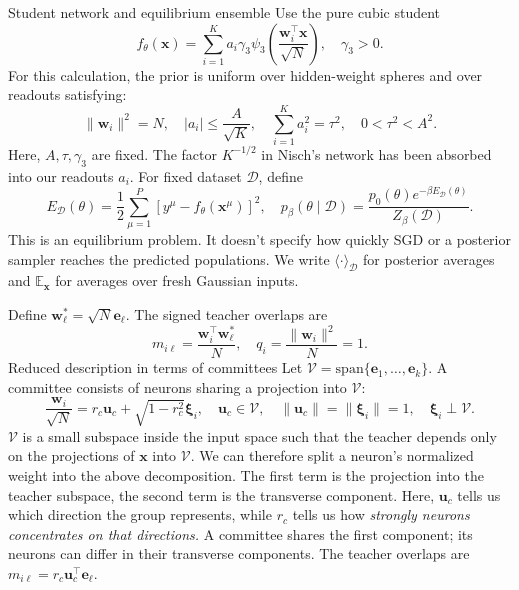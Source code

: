 \documentclass[11pt, reqno]{amsart}
\makeatletter
\def\section{\@startsection{section}{1}%
  \z@{.7\linespacing\@plus\linespacing}{.5\linespacing}%
  {\normalfont\scshape\centering}}
\theoremstyle{notestyle}
\theoremstyle{defstyle}
\makeatother
\begin{document}
\section{Student network and equilibrium ensemble}
Use the pure cubic student
\begin{equation}
    f_\theta(\mathbf x) = \sum_{i=1}^K a_i \gamma_3 \psi_3\left( \frac{\mathbf w_i^\top \mathbf x}{\sqrt N}\right),\quad \gamma_3 > 0.
\end{equation}
For this calculation, the prior is uniform over hidden-weight spheres and over readouts satisfying:
\begin{equation}
    \|\mathbf w_i\|^2 = N,\quad |a_i| \leq \frac{A}{\sqrt K},\quad \sum_{i=1}^K a_i^2 = \tau^2,\quad 0 < \tau^2 < A^2.
\end{equation}
Here, $A, \tau, \gamma_3$ are fixed. The factor $K^{-1/2}$ in Nisch's network has been absorbed into our readouts $a_i$. For fixed dataset $\mathcal D$, define
\begin{equation}
    E_{\mathcal D}(\theta) = \frac 12 \sum_{\mu=1}^P[y^\mu - f_\theta(\mathbf x^\mu)]^2,\quad p_\beta(\theta \mid \mathcal D) = \frac{p_0(\theta)e^{-\beta E_{\mathcal D}(\theta)}}{Z_\beta (\mathcal D)}.
\end{equation}
This is an equilibrium problem. It doesn't specify how quickly SGD or a posterior sampler reaches the predicted populations. We write $\langle \cdot \rangle_{\mathcal D}$ for posterior averages and $\mathbb E_{\mathbf x}$ for averages over fresh Gaussian inputs.

Define $\mathbf w_\ell^* = \sqrt N \mathbf e_\ell$. The signed teacher overlaps are
\begin{equation}
    m_{i\ell} = \frac{\mathbf w_i^\top \mathbf w_\ell^*}{N},\quad q_i = \frac{\|\mathbf w_i\|^2}{N} = 1.
\end{equation}
\section{Reduced description in terms of committees}
Let $\mathcal V = \mathrm{span}\{\mathbf e_1, \ldots, \mathbf e_k\}$. A committee consists of neurons sharing a projection into $\mathcal V$:
\begin{equation}
    \frac{\mathbf w_i}{\sqrt N} = r_c \mathbf u_c + \sqrt{1 - r_c^2 }\bm \xi_i,\quad \mathbf u_c \in \mathcal V,\quad \|\mathbf u_c\| = \|\bm \xi_i\| = 1,\quad \bm\xi_i \perp \mathcal V.
\end{equation}
$\mathcal V$ is a small subspace inside the input space such that the teacher depends only on the projections of $\mathbf x$ into $\mathcal V$. We can therefore split a neuron's normalized weight into the above decomposition. The first term is the projection into the teacher subspace, the second term is the transverse component. Here, $\mathbf u_c$ tells us which direction the group represents, while $r_c$ tells us how \textit{strongly neurons concentrates on that directions.} A committee shares the first component; its neurons can differ in their transverse components. The teacher overlaps are $m_{i\ell} = r_c \mathbf u_c^\top \mathbf e_\ell$.
\end{document}
